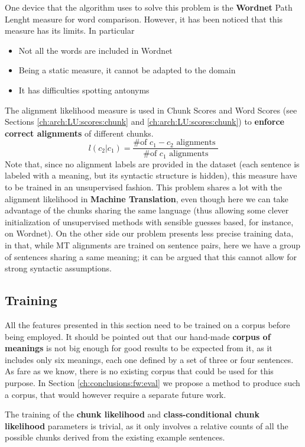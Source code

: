 One device that the algorithm uses to solve this problem is the \textbf{Wordnet} Path Lenght measure for word comparison. However, it has been noticed that this measure has its limits. In particular
\begin{itemize}
\item Not all the words are included in Wordnet
\item Being a static measure, it cannot be adapted to the domain
\item It has difficulties spotting antonyms
\end{itemize}
The alignment likelihood measure is used in Chunk Scores and Word Scores (see Sections \ref{ch:arch:LU:scores:chunk} and \ref{ch:arch:LU:scores:chunk}) to \textbf{enforce correct alignments} of different chunks.
$$
l(c_2|c_1)=\frac{\text{\# of }c_1-c_2\text{ alignments }}{\text{\# of }c_1\text{ alignments}}
$$
Note that, since no alignment labels are provided in the dataset (each sentence is labeled with a meaning, but its syntactic structure is hidden), this measure have to be trained in an unsupervised fashion. This problem shares a lot with the alignment likelihood in \textbf{Machine Translation}, even though here we can take advantage of the chunks sharing the same language (thus allowing some clever initialization of unsupervised methods with sensible guesses based, for instance, on Wordnet). On the other side our problem presents less precise training data, in that, while MT alignments are trained on sentence pairs, here we have a group of sentences sharing a same meaning; it can be argued that this cannot allow for strong syntactic assumptions.

\subsection{Training}
All the features presented in this section need to be trained on a corpus before being employed. It should be pointed out that our hand-made \textbf{corpus of meanings} is not big enough for good results to be expected from it, as it includes only six meanings, each one defined by a set of three or four sentences. As fare as we know, there is no existing corpus that could be used for this purpose. In Section \ref{ch:conclusions:fw:eval} we propose a method to produce such a corpus, that would however require a separate future work.

The training of the \textbf{chunk likelihood} and \textbf{class-conditional chunk likelihood} parameters is trivial, as it only involves a relative counts of all the possible chunks derived from the existing example sentences.

